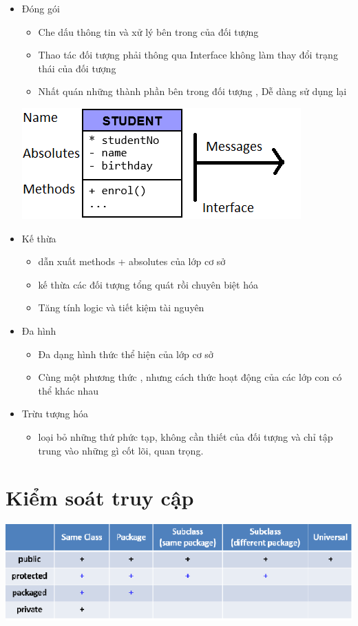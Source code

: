 \documentclass{article}
\begin{document}
\begin{itemize}
  \item Đóng gói
        \begin{itemize}
          \item Che dấu thông tin và xử lý bên trong của đối tượng
          \item Thao tác đối tượng phải thông qua Interface không làm thay đổi trạng thái của đối tượng
          \item Nhất quán những thành phần bên trong đối tượng , Dễ dàng sử dụng lại
        \end{itemize}
        \break
        \includegraphics{Object}
        \break
  \item Kế thừa
        \begin{itemize}
          \item dẫn xuất methods + absolutes của lớp cơ sở
          \item kế thừa các đối tượng tổng quát rồi chuyên biệt hóa
          \item Tăng tính logic và tiết kiệm tài nguyên
        \end{itemize}
  \item Đa hình
        \begin{itemize}
          \item Đa dạng hình thức thể hiện của lớp cơ sở
          \item Cùng một phương thức , nhưng cách thức hoạt động của các lớp con có thể khác nhau
        \end{itemize}
  \item Trừu tượng hóa
        \begin{itemize}
          \item loại bỏ những thứ phức tạp, không cần thiết của đối tượng và chỉ tập trung vào những gì cốt lõi, quan trọng.
        \end{itemize}
\end{itemize}

\section{Kiểm soát truy cập}
\includegraphics{ConnectionControl}
\end{document}

